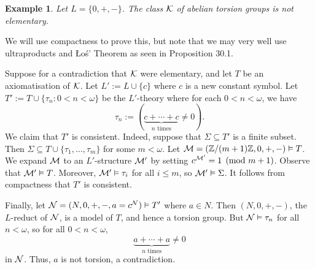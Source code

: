 \documentclass[10pt]{article}
\makeatletter
\newcommand{\Z}{\mathbb{Z}}
\theoremstyle{newstyle}
\newtheorem{exmp}[thm]{Example}
\newenvironment{pf}[1][\proofname]{\par
  \pushQED{\qed}%
  \normalfont \topsep0\p@\relax
  \trivlist
  \item[\hskip\labelsep\scshape
  #1\@addpunct{.}]\ignorespaces
}{%
  \popQED\endtrivlist\@endpefalse
}
\makeatother
\begin{document}
\begin{exmp}
Let $L = \{0, +, -\}$. The class ${\cal K}$ of abelian torsion groups is not elementary.
\end{exmp}
\begin{pf}
We will use compactness to prove this, but note that we may very well use ultraproducts
and \L{}o\'s' Theorem as seen in Proposition 30.1. 

Suppose for a contradiction that ${\cal K}$ were elementary, and let $T$ 
be an axiomatisation of ${\cal K}$. Let $L' := L \cup \{c\}$ where $c$ is a new constant symbol. 
Let $T' := T \cup \{\tau_n : 0 < n < \omega\}$ be the $L'$-theory where for each 
$0 < n < \omega$, we have 
\[ \tau_n := (\underbrace{c + \cdots + c}_{\text{$n$ times}} \neq 0). \]
We claim that $T'$ is consistent. Indeed, suppose that $\Sigma \subseteq T'$ is a finite subset. 
Then $\Sigma \subseteq T \cup \{\tau_1, \dots, \tau_m\}$ for some $m < \omega$. Let 
${\cal M} = (\Z/(m+1)\Z, 0, +, -) \vDash T$. We expand ${\cal M}$ to an $L'$-structure 
${\cal M}'$ by setting $c^{{\cal M}'} = 1 \pmod{m+1}$. Observe that ${\cal M}' \vDash T$. 
Moreover, ${\cal M}' \vDash \tau_i$ for all $i \leq m$, so ${\cal M}' \vDash \Sigma$. 
It follows from compactness that $T'$ is consistent. 

Finally, let ${\cal N} = (N, 0, +, -, a = c^{\cal N}) \vDash T'$ where $a \in N$. 
Then $(N, 0, +, -)$, the $L$-reduct of ${\cal N}$, is a model of $T$, and hence a torsion group. 
But ${\cal N} \vDash \tau_n$ for all $n < \omega$, so for all $0 < n < \omega$, 
\[ \underbrace{a + \cdots + a}_{\text{$n$ times}} \neq 0 \] 
in ${\cal N}$. Thus, $a$ is not torsion, a contradiction.
\end{pf}
\end{document}
